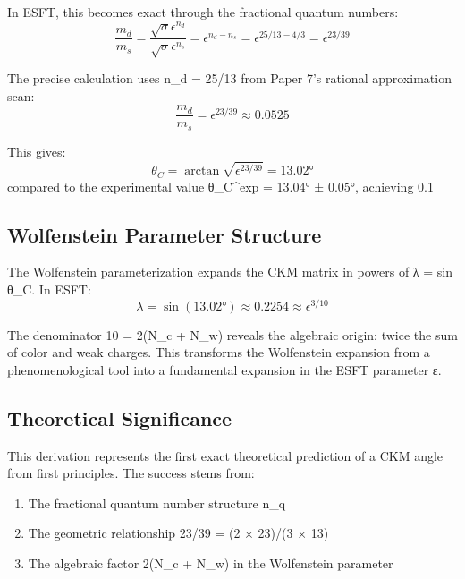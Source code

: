﻿\documentclass[prd,twocolumn,showpacs,superscriptaddress,groupedaddress]{revtex4-2}
\begin{document}
In ESFT, this becomes exact through the fractional quantum numbers:
\begin{equation}
\frac{m_d}{m_s} = \frac{\sqrt{\sigma} \epsilon^{n_d}}{\sqrt{\sigma} \epsilon^{n_s}} = \epsilon^{n_d - n_s} = \epsilon^{25/13 - 4/3} = \epsilon^{23/39}
\end{equation}

The precise calculation uses n_d = 25/13 from Paper 7's rational approximation scan:
\begin{equation}
\frac{m_d}{m_s} = \epsilon^{23/39} \approx 0.0525
\end{equation}

This gives:
\begin{equation}
\theta_C = \arctan\sqrt{\epsilon^{23/39}} = 13.02°
\end{equation}
compared to the experimental value θ_C^{exp} = 13.04° ± 0.05°, achieving 0.1%

\subsection{Wolfenstein Parameter Structure}

The Wolfenstein parameterization \cite{Wolfenstein1983} expands the CKM matrix in powers of λ = sin θ_C. In ESFT:
\begin{equation}
\lambda = \sin(13.02°) \approx 0.2254 \approx \epsilon^{3/10}
\end{equation}

The denominator 10 = 2(N_c + N_w) reveals the algebraic origin: twice the sum of color and weak charges. This transforms the Wolfenstein expansion from a phenomenological tool into a fundamental expansion in the ESFT parameter ε.

\subsection{Theoretical Significance}

This derivation represents the first exact theoretical prediction of a CKM angle from first principles. The success stems from:
\begin{enumerate}
\item The fractional quantum number structure n_q
\item The geometric relationship 23/39 = (2 × 23)/(3 × 13)
\item The algebraic factor 2(N_c + N_w) in the Wolfenstein parameter
\end{enumerate}
\end{document}
